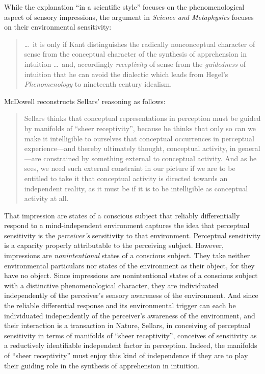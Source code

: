 \documentclass[12pt]{article}
\begin{document}
While the explanation ``in a scientific style'' focuses on the phenomenological aspect of sensory impressions, the argument in \emph{Science and Metaphysics} focuses on their environmental sensitivity:
\begin{quote}
    \ldots\ it is only if Kant distinguishes the radically nonconceptual character of sense from the conceptual character of the synthesis of apprehension in intuition \ldots\ and, accordingly \emph{receptivity} of sense from the \emph{guidedness} of intuition that he can avoid the dialectic which leads from Hegel's \emph{Phenomenology} to nineteenth century idealism. \citep[16]{Sellars:1967uq}
\end{quote}
McDowell reconstructs Sellars' reasoning as follows:
\begin{quote}
    Sellars thinks that conceptual representations in perception must be guided by manifolds of ``sheer receptivity'', because he thinks that only so can we make it intelligible to ourselves that conceptual occurrences in perceptual experience---and thereby ultimately thought, conceptual activity, in general---are constrained by something external to conceptual activity. And as he sees, we need such external constraint in our picture if we are to be entitled to take it that conceptual activity is directed towards an independent reality, as it must be if it is to be intelligible as conceptual activity at all. \citep[46]{McDowell:1998vn}
\end{quote}

That impression are states of a conscious subject that reliably differentially respond to a mind-independent environment captures the idea that perceptual sensitivity is the \emph{perceiver's} sensitivity to that environment. Perceptual sensitivity is a capacity properly attributable to the perceiving subject. However, impressions are \emph{nonintentional} states of a conscious subject. They take neither environmental particulars nor states of the environment as their object, for they have no object. Since impressions are nonintentional states of a conscious subject with a distinctive phenomenological character, they are individuated independently of the perceiver's sensory awareness of the environment. And since the reliable differential response and its environmental trigger can each be individuated independently of the perceiver's awareness of the environment, and their interaction is a transaction in Nature, Sellars, in conceiving of perceptual sensitivity in terms of manifolds of ``sheer receptivity'', conceives of sensitivity as a reductively identifiable independent factor in perception. Indeed, the manifolds of ``sheer receptivity'' must enjoy this kind of independence if they are to play their guiding role in the synthesis of apprehension in intuition.
\end{document}
